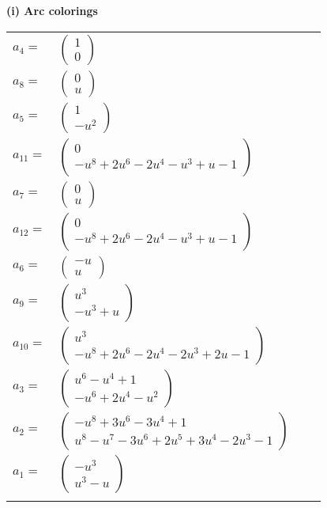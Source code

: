 \documentclass[1p]{elsarticle_modified}
\theoremstyle{definition}
\begin{document}
\flushleft \textbf{(i) Arc colorings}\\
\begin{tabular}{m{7pt} m{180pt} m{7pt} m{180pt} }
\flushright $a_{4}=$&$\begin{pmatrix}1\\0\end{pmatrix}$ \\
\flushright $a_{8}=$&$\begin{pmatrix}0\\u\end{pmatrix}$ \\
\flushright $a_{5}=$&$\begin{pmatrix}1\\- u^2\end{pmatrix}$ \\
\flushright $a_{11}=$&$\begin{pmatrix}0\\- u^8+2 u^6-2 u^4- u^3+u-1\end{pmatrix}$ \\
\flushright $a_{7}=$&$\begin{pmatrix}0\\u\end{pmatrix}$ \\
\flushright $a_{12}=$&$\begin{pmatrix}0\\- u^8+2 u^6-2 u^4- u^3+u-1\end{pmatrix}$ \\
\flushright $a_{6}=$&$\begin{pmatrix}- u\\u\end{pmatrix}$ \\
\flushright $a_{9}=$&$\begin{pmatrix}u^3\\- u^3+u\end{pmatrix}$ \\
\flushright $a_{10}=$&$\begin{pmatrix}u^3\\- u^8+2 u^6-2 u^4-2 u^3+2 u-1\end{pmatrix}$ \\
\flushright $a_{3}=$&$\begin{pmatrix}u^6- u^4+1\\- u^6+2 u^4- u^2\end{pmatrix}$ \\
\flushright $a_{2}=$&$\begin{pmatrix}- u^8+3 u^6-3 u^4+1\\u^8- u^7-3 u^6+2 u^5+3 u^4-2 u^3-1\end{pmatrix}$ \\
\flushright $a_{1}=$&$\begin{pmatrix}- u^3\\u^3- u\end{pmatrix}$\\&\end{tabular}
\end{document}
